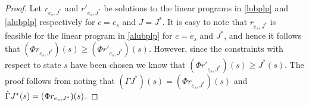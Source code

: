 \begin{proof}
Let $r_{e_s,J^*}$ and ${r}'_{e_s,J^*}$ be solutions to the linear programs in \eqref{lubplp} and \eqref{alubplp} respectively for $c=e_s$ and $J=J^*$. It is easy to note that $r_{e_s,J^*}$ is feasible for the linear program in \eqref{alubplp} for $c=e_s$ and $J^*$, and hence it follows that $(\Phi r_{e_s,J^*})(s)\geq (\Phi {r}'_{e_s,J^*})(s)$. However, since the constraints with respect to state $s$ have been chosen we know that $(\Phi {r}'_{e_s,J^*})(s)\geq J^*(s)$. The proof follows from noting that $(\Gamma J^*)(s)=(\Phi r_{e_s,J^*})(s)$ and $\hat{\Gamma} J^*(s)=(\Phi {r}_{e_s,J^*})(s)$.
\end{proof}
\fi


